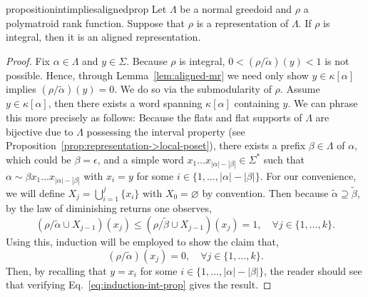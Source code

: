 \documentclass[11pt]{article}
\newcommand{\univ}{\Sigma}
\newcommand{\glang}{\Lambda}
\begin{document}
\iffalse

\begin{restatable}{proposition}{intimpliesalignedprop}\label{prop:int->aligned}
    Let $\glang$ be a normal greedoid and $\rho$ a polymatroid rank function.
    Suppose that $\rho$ is a representation of $\glang$.
    If $\rho$ is integral, then it is an aligned representation.
\end{restatable}
\begin{proof}
    Fix $\alpha \in \glang$ and $y \in \univ$.
    Because $\rho$ is integral, $0 < (\rho/\widetilde{\alpha})(y) < 1$ is not possible.
    Hence, through Lemma~\ref{lem:aligned-mr} we need only show $y \in \kappa[\alpha]$ implies $(\rho/\widetilde{\alpha})(y) = 0$.
    We do so via the submodularity of $\rho$.
    Assume $y \in \kappa[\alpha]$, then there exists a word spanning $\kappa[\alpha]$ containing $y$.
    We can phrase this more precisely as follows: Because the flats and flat supports of $\glang$ are bijective due to $\glang$ possessing the interval property (see Proposition~\ref{prop:representation->local-poset}), there exists a prefix $\beta \in\glang$ of $\alpha$, which could be $\beta = \epsilon$, and a simple word $x_1\ldots x_{|\alpha| - |\beta|} \in \univ^*$ such that $\alpha\sim\beta x_1\ldots x_{|\alpha|-|\beta|}$ with $x_i = y$ for some $i \in\{1,\ldots,|\alpha| - |\beta|\}$.
    For our convenience, we will define $X_j = \bigcup_{i = 1}^j \{x_i\}$ with $X_0 = \varnothing$ by convention.
    Then because $\widetilde{\alpha} \supseteq \widetilde{\beta}$, by the law of diminishing returns one observes,
    \begin{equation}\label{eq:itr-lodr-gen-prop} (\rho / \widetilde{\alpha} \cup X_{j - 1})(x_j) \leq (\rho/ \widetilde{\beta} \cup X_{j-1})(x_j) = 1,\quad\forall j\in\{1, \ldots, k\}. \end{equation}
    Using this, induction will be employed to show the claim that,
    \begin{equation}\label{eq:induction-int-prop}
        (\rho / \widetilde{\alpha})(x_j) = 0,\quad\forall j\in\{1,\ldots,k\}.
    \end{equation}
    Then, by recalling that $y = x_i$ for some $i \in \{1,\ldots, |\alpha|-|\beta|\}$, the reader should see that verifying Eq.~\ref{eq:induction-int-prop} gives the result.
    

\end{proof}
\end{document}
